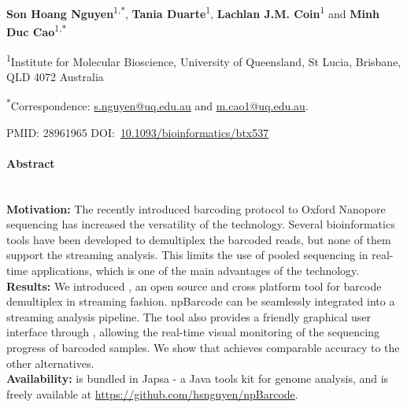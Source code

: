 \clearpage
\thispagestyle{empty}
\vskip36pt
{\raggedright\sffamily\bfseries\fontsize{20}{25}\selectfont {Real-time demultiplexing Nanopore barcoded sequencing data with npBarcode}\par}
\vskip20pt
{\raggedright\sffamily\fontsize{12}{12} {
\textbf{Son Hoang Nguyen}\textsuperscript{1,$\ast$},
\textbf{Tania Duarte}\textsuperscript{1},
\textbf{Lachlan J.M. Coin}\textsuperscript{1} and
\textbf{Minh Duc Cao}\textsuperscript{1,$\ast$}
}\par}
\vskip10pt
{\raggedright\sffamily\fontsize{10}{12} {
\textsuperscript{1}Institute for Molecular Bioscience, University of Queensland, 
St Lucia, Brisbane, QLD 4072 Australia \par
\textsuperscript{$\ast$}Correspondence:
\href{s.nguyen@uq.edu.au}{s.nguyen@uq.edu.au} and 
\href{m.cao1@uq.edu.au}{m.cao1@uq.edu.au}.
}\par}
\vskip10pt
{\raggedright\sffamily\fontsize{12}{16}\selectfont  {Received 20 Jun 2017. Accepted 23 Aug 2017. Published 24 Aug 2017}\par}
\vskip10pt
{\raggedright\sffamily\fontsize{12}{16}\selectfont  
PMID: 28961965 \hskip15pt DOI:~\href{https://doi.org/10.1093/bioinformatics/btx537}{10.1093/bioinformatics/btx537}\par}
\vskip10pt
\paragraph{Abstract}\mbox{}\\
\textbf{Motivation:} The recently introduced barcoding protocol 
to Oxford Nanopore sequencing has increased the versatility of the technology.
Several bioinformatics tools have been developed to demultiplex the barcoded 
reads, but none of them support the streaming analysis. This limits the use
of pooled sequencing in real-time applications, which is one of the main 
advantages of the technology.\\
\textbf{Results:} We introduced \npbarcode{}, an open source and cross platform 
tool for barcode demultiplex in streaming fashion. npBarcode can be seamlessly 
integrated into a streaming analysis pipeline. The tool also provides a friendly
graphical user interface through \npreader{}, allowing the real-time visual 
monitoring of the sequencing progress of barcoded samples. 
We show that
\npbarcode{} achieves comparable accuracy to the other alternatives. \\
\textbf{Availability:} \npbarcode{} is bundled in Japsa - a Java tools kit for 
genome analysis, and is freely available at 
\href{https://github.com/hsnguyen/npBarcode}{https://github.com/hsnguyen/npBarcode}.
\clearpage
\pagebreak

